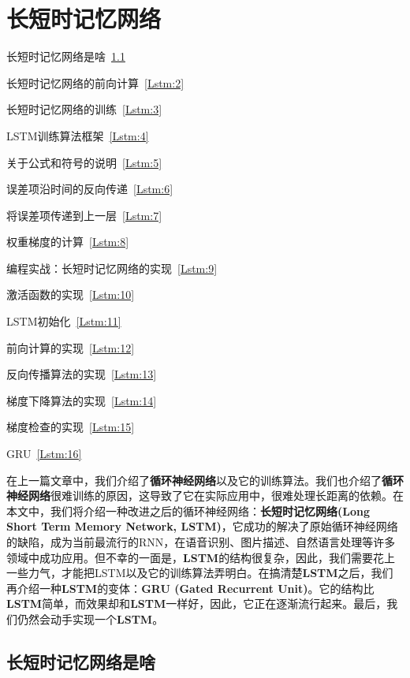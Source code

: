 \chapter{长短时记忆网络}\label{chap:Lstm}

\begin{introduction}
	\item 长短时记忆网络是啥~\ref{Lstm:1}
	\item 长短时记忆网络的前向计算~\ref{Lstm:2}
	\item 长短时记忆网络的训练~\ref{Lstm:3}
	\item LSTM训练算法框架~\ref{Lstm:4}
	\item 关于公式和符号的说明~\ref{Lstm:5}
	\item 误差项沿时间的反向传递~\ref{Lstm:6}
	\item 将误差项传递到上一层~\ref{Lstm:7}
	\item 权重梯度的计算~\ref{Lstm:8}
	\item 编程实战：长短时记忆网络的实现~\ref{Lstm:9}
	\item 激活函数的实现~\ref{Lstm:10}
	\item LSTM初始化~\ref{Lstm:11}
	\item 前向计算的实现~\ref{Lstm:12}
	\item 反向传播算法的实现~\ref{Lstm:13}
	\item 梯度下降算法的实现~\ref{Lstm:14}
	\item 梯度检查的实现~\ref{Lstm:15}
	\item GRU~\ref{Lstm:16}
\end{introduction}

在上一篇文章中，我们介绍了\textbf{循环神经网络}以及它的训练算法。我们也介绍了\textbf{循环神经网络}很难训练的原因，这导致了它在实际应用中，很难处理长距离的依赖。在本文中，我们将介绍一种改进之后的循环神经网络：\textbf{长短时记忆网络(Long Short Term Memory Network, LSTM)}，它成功的解决了原始循环神经网络的缺陷，成为当前最流行的RNN，在语音识别、图片描述、自然语言处理等许多领域中成功应用。但不幸的一面是，\textbf{LSTM}的结构很复杂，因此，我们需要花上一些力气，才能把LSTM以及它的训练算法弄明白。在搞清楚\textbf{LSTM}之后，我们再介绍一种\textbf{LSTM}的变体：\textbf{GRU (Gated Recurrent Unit)}。它的结构比\textbf{LSTM}简单，而效果却和\textbf{LSTM}一样好，因此，它正在逐渐流行起来。最后，我们仍然会动手实现一个\textbf{LSTM}。

\section{长短时记忆网络是啥}\label{Lstm:1}


